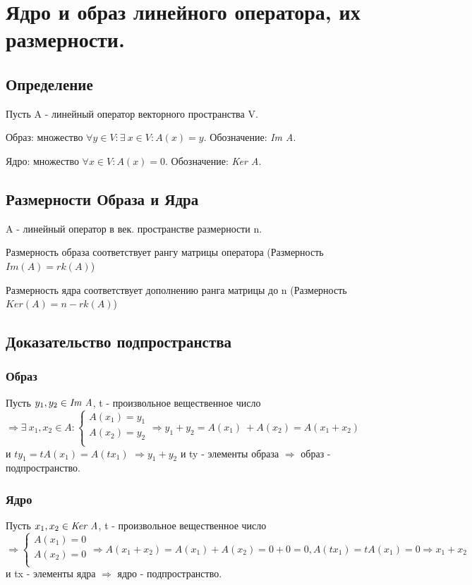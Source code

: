 \documentclass[12pt]{article}
\begin{document}
\section{Ядро и образ линейного оператора, их размерности.}
\subsection{Определение}
Пусть A - линейный оператор векторного пространства V.

Образ: множество $\forall y \in V : \exists\ x \in V : A(x) = y$. Обозначение: \emph{Im A}.

Ядро: множество $\forall x \in V : A(x) = 0$. Обозначение: \emph{Ker A}.

\subsection{Размерности Образа и Ядра}
A - линейный оператор в век. пространстве размерности n.

Размерность образа соответствует рангу матрицы оператора (Размерность $Im(A) = rk(A)$)

Размерность ядра соответствует дополнению ранга матрицы до n (Размерность $Ker(A) = n - rk(A)$)

\subsection{Доказательство подпространства}

\subsubsection{Образ}
Пусть $y_1, y_2 \in \emph{Im A}$, t - произвольное вещественное число $\Rightarrow \exists\ x_1, x_2 \in A : \begin{cases}
        A(x_1) = y_1 \\
        A(x_2) = y_2 \\
    \end{cases}
    \Rightarrow y_1 + y_2 = A(x_1)\ + A(x_2) = A(x_1 + x_2)$ и $ty_1 = tA(x_1) = A(tx_1)$ $\Rightarrow y_1 + y_2$ и ty - элементы образа $\Rightarrow$ образ - подпространство.

\subsubsection{Ядро}
Пусть $x_1, x_2 \in \emph{Ker A}$, t - произвольное вещественное число $\Rightarrow \begin{cases}
        A(x_1) = 0 \\
        A(x_2) = 0 \\
    \end{cases}
    \Rightarrow A(x_1+x_2) = A(x_1) + A(x_2) = 0 + 0 = 0, A(tx_1) = tA(x_1) = 0 \Rightarrow x_1 + x_2$ и tx - элементы ядра $\Rightarrow$ ядро - подпространство.
\end{document}
